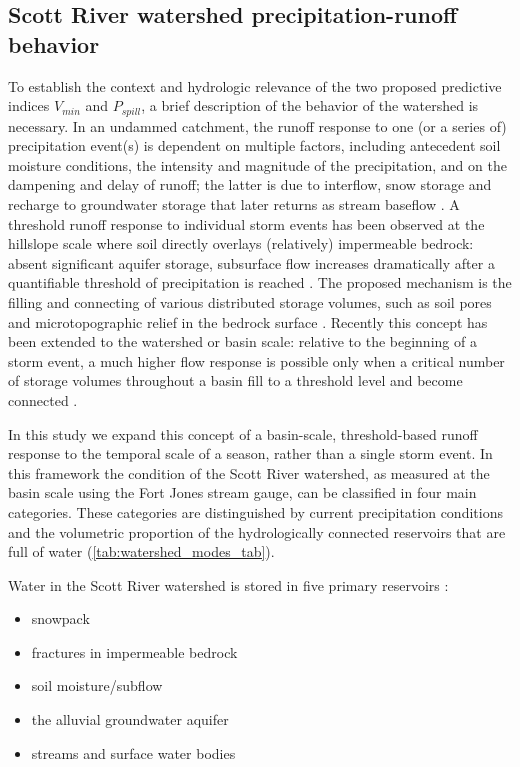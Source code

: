 \documentclass[hess, manuscript]{copernicus}
\providecommand{\tightlist}{%
  \setlength{\itemsep}{0pt}\setlength{\parskip}{0pt}}
\begin{document}
\subsection{Scott River watershed precipitation-runoff behavior}

To establish the context and hydrologic relevance of the two proposed
predictive indices \(V_{min}\) and \(P_{spill}\), a brief description of
the behavior of the watershed is necessary. In an undammed catchment,
the runoff response to one (or a series of) precipitation event(s) is
dependent on multiple factors, including antecedent soil moisture
conditions, the intensity and magnitude of the precipitation, and on the
dampening and delay of runoff; the latter is due to interflow, snow
storage and recharge to groundwater storage that later returns as stream
baseflow \citep{Tarboton2003}. A threshold runoff response to individual
storm events has been observed at the hillslope scale where soil
directly overlays (relatively) impermeable bedrock: absent significant
aquifer storage, subsurface flow increases dramatically after a
quantifiable threshold of precipitation is reached
\citep{Tromp-VanMeerveld2006}. The proposed mechanism is the filling and
connecting of various distributed storage volumes, such as soil pores
and microtopographic relief in the bedrock surface
\citep{Tromp-VanMeerveld2006}. Recently this concept has been extended
to the watershed or basin scale: relative to the beginning of a storm
event, a much higher flow response is possible only when a critical
number of storage volumes throughout a basin fill to a threshold level
and become connected \citep{McDonnell2021}.

In this study we expand this concept of a basin-scale, threshold-based
runoff response to the temporal scale of a season, rather than a single
storm event. In this framework the condition of the Scott River
watershed, as measured at the basin scale using the Fort Jones stream
gauge, can be classified in four main categories. These categories are
distinguished by current precipitation conditions and the volumetric
proportion of the hydrologically connected reservoirs that are full of
water (\autoref{tab:watershed_modes_tab}).

Water in the Scott River watershed is stored in five primary reservoirs
\citep{Harter2008}:

\begin{itemize}
\tightlist
\item
  snowpack
\item
  fractures in impermeable bedrock
\item
  soil moisture/subflow
\item
  the alluvial groundwater aquifer
\item
  streams and surface water bodies
\end{itemize}
\end{document}
